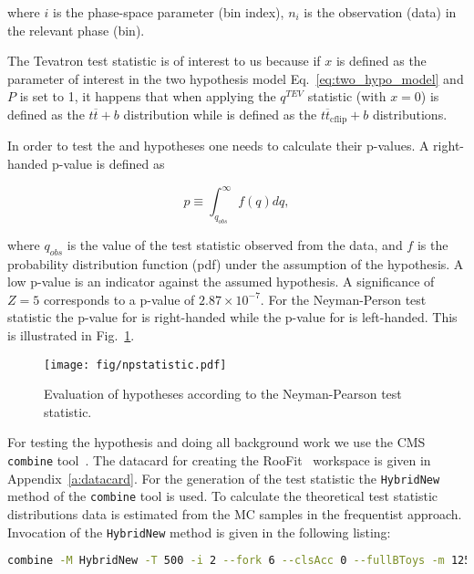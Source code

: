 \noindent where $i$ is the phase-space parameter (bin index), $n_{i}$ is the observation (data) in the relevant phase (bin).

The Tevatron test statistic is of interest to us because if $x$ is defined as the parameter of interest in the two hypothesis model Eq.~\ref{eq:two_hypo_model} and $P$ is set to 1, it happens that when applying the $q^{TEV}$ statistic \Hnull (with $x=0$) is defined as the $t\overline{t} + b$ distribution while \Halt is defined as the $t\overline{t}_{\text{cflip}} + b$ distributions.

In order to test the \Hnull and \Halt hypotheses one needs to calculate their p-values. A right-handed p-value is defined as

\begin{equation}
p\equiv\int_{q_{obs}}^{\infty}f(q)dq,
\end{equation}
    
\noindent where $q_{obs}$ is the value of the test statistic observed from the data, and $f$ is the probability distribution function (pdf) under the assumption of the hypothesis. A low p-value is an indicator against the assumed hypothesis. A significance of $Z=5$ corresponds to a p-value of $2.87\times10^{-7}$. For the Neyman-Person test statistic the p-value for \Hnull is right-handed while the p-value for \Halt is left-handed. This is illustrated in Fig.~\ref{fig:npstatistic}.

\begin{figure}
  \centering
  \texttt{[image: fig/npstatistic.pdf]}
  \caption{Evaluation of hypotheses according to the Neyman-Pearson test statistic.}
  \label{fig:npstatistic}
\end{figure}

For testing the hypothesis and doing all background work we use the CMS \lstinline[language=sh]|combine| tool~\cite{url:combine}. The datacard for creating the RooFit~\cite{url:roofit} workspace is given in Appendix~\ref{a:datacard}. For the generation of the test statistic the \lstinline[language=sh]|HybridNew| method of the \lstinline[language=sh]|combine| tool is used. To calculate the theoretical test statistic distributions data is estimated from the MC samples in the frequentist approach. Invocation of the \lstinline[language=sh]|HybridNew| method is given in the following listing:

\begin{lstlisting}[language=sh, breaklines=true]
  combine -M HybridNew -T 500 -i 2 --fork 6 --clsAcc 0 --fullBToys -m 125.7 TwoHypo.root --seed 8192 --testStat=TEV  --saveHybridResult --singlePoint 1
\end{lstlisting}

